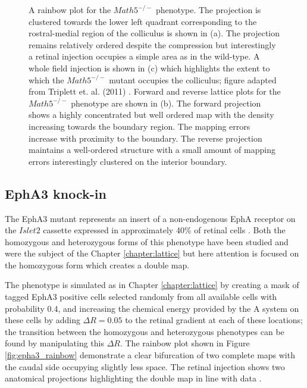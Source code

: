 \begin{figure}
	\def\c{A rainbow plot for the $Math5^{-/-}$ phenotype. }
	\caption[\c]{\c The projection is clustered towards the lower left quadrant corresponding to the rostral-medial region of the colliculus is shown in (a). The projection remains relatively ordered despite the compression but interestingly a retinal injection occupies a simple area as in the wild-type. A whole field injection is shown in (c) which highlights the extent to which the $Math5^{-/-}$ mutant occupies the colliculus; figure adapted from Triplett et. al. (2011) \cite{Triplett2011-jk}. Forward and reverse lattice plots for the $Math5^{-/-}$ phenotype are shown in (b). The forward projection shows a highly concentrated but well ordered map with the density increasing towards the boundary region. The mapping errors increase with proximity to the boundary. The reverse projection maintains a well-ordered structure with a small amount of mapping errors interestingly clustered on the interior boundary.}
\end{figure}


\newpage
\subsection{EphA3 knock-in}
The EphA3 mutant represents an insert of a non-endogenous EphA receptor on the $Islet2$ cassette expressed in approximately 40\% of retinal cells \cite{Brown2000-da, Reber2004-wq}. Both the homozygous and heterozygous forms of this phenotype have been studied and were the subject of the Chapter \ref{chapter:lattice} but here attention is focused on the homozygous form which creates a double map. 

The phenotype is simulated as in Chapter \ref{chapter:lattice} by creating a mask of tagged EphA3 positive cells selected randomly from all available cells with probability 0.4, and increasing the chemical energy provided by the A system on these cells by adding $\Delta R = 0.05$ to the retinal gradient at each of these locations; the transition between the homozygous and heterozygous phenotypes can be found by manipulating this $\Delta R$. The rainbow plot shown in Figure \ref{fig:epha3_rainbow} demonstrate a clear bifurcation of two complete maps with the caudal side occupying slightly less space. The retinal injection shows two anatomical projections highlighting the double map in line with data \cite{Brown2000-da}.

